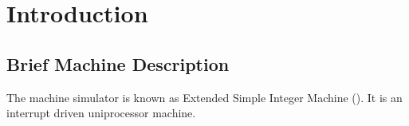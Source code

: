 \chapter{Introduction }
\label{chp:intro}

%
%
%
%

\section{Brief Machine Description}
The machine simulator is known as Extended Simple Integer Machine (\ESIM).
It is an interrupt driven uniprocessor machine.

